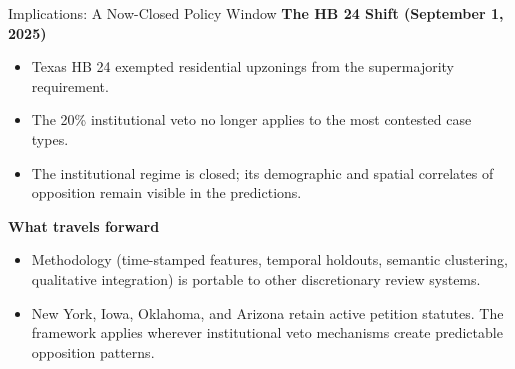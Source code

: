 \documentclass[10pt, aspectratio=169]{beamer}
\begin{document}
\begin{frame}{Implications: A Now-Closed Policy Window}
 \textbf{The HB 24 Shift (September 1, 2025)}
 \begin{itemize}
 \item Texas HB 24 exempted residential upzonings from the supermajority requirement.
 \item The 20\% institutional veto no longer applies to the most contested case types.
 \item The institutional regime is closed; its demographic and spatial correlates of opposition remain visible in the predictions.
 \end{itemize}

 \vspace{1.2em}
 \textbf{What travels forward}
 \begin{itemize}
 \item Methodology (time-stamped features, temporal holdouts, semantic clustering, qualitative integration) is portable to other discretionary review systems.
 \item New York, Iowa, Oklahoma, and Arizona retain active petition statutes. The framework applies wherever institutional veto mechanisms create predictable opposition patterns.
 \end{itemize}
\end{frame}
\end{document}
